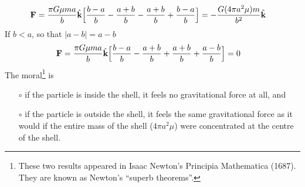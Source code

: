 \begin{eg}
\begin{align*}
\mathbf{F}&=\frac{\pi G\mu m a}{b} \hat{\mathbf{k}}\Big[ 
       \frac{b-a}{b}
            -\frac{a+b}{b}
            -\frac{a+b}{b}
            +\frac{b-a}{b}
   \Big]
=-\frac{G(4\pi a^2\mu)m}{b^2} \hat{\mathbf{k}}
\end{align*}
If $b<a$, so that $|a-b|=a-b$
\begin{align*}
\mathbf{F}&=\frac{\pi G\mu m a}{b} \hat{\mathbf{k}}\Big[ 
      \frac{b-a}{b}
            -\frac{a+b}{b}
            +\frac{a+b}{b}
            +\frac{a-b}{b}
   \Big]
=0
\end{align*}
The moral\footnote{These two results appeared in Isaac Newton's
Principia Mathematica (1687). They are known as Newton's ``superb 
theorems''.} is
\begin{itemize}
\item[$\circ$] 
if the particle is inside the shell, it feels no gravitational force at all,
and
\item[$\circ$]
if the particle is outside the shell, it feels the same gravitational force
as it would if the entire mass of the shell ($4\pi a^2\mu$) were
concentrated at the centre of the shell.
\end{itemize}
\end{eg}

